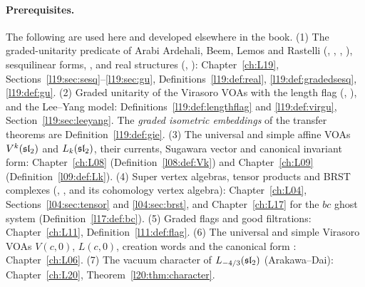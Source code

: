 \paragraph{Prerequisites.} The following are used here and developed elsewhere in the book.
(1) The graded-unitarity predicate of Arabi Ardehali, Beem, Lemos and Rastelli (,
, , ), sesquilinear forms, ,
 and real structures (, ): Chapter~\ref{ch:L19},
Sections~\ref{l19:sec:sesq}--\ref{l19:sec:gu}, Definitions~\ref{l19:def:real}, \ref{l19:def:gradedsesq},
\ref{l19:def:gu}. (2) Graded unitarity of the Virasoro VOAs with the length flag (,
), and the Lee--Yang model: Definitions~\ref{l19:def:lengthflag} and \ref{l19:def:virgu},
Section~\ref{l19:sec:leeyang}. The \emph{graded isometric embeddings} of the transfer theorems are
Definition~\ref{l19:def:gie}. (3) The universal and simple affine VOAs $V^k(\mathfrak{sl}_2)$ and
$L_k(\mathfrak{sl}_2)$, their currents, Sugawara vector and canonical invariant form: Chapter~\ref{ch:L08}
(Definition~\ref{l08:def:Vk}) and Chapter~\ref{ch:L09} (Definition~\ref{l09:def:Lk}). (4) Super vertex algebras,
tensor products and BRST complexes (, ,  and
its cohomology vertex algebra): Chapter~\ref{ch:L04}, Sections~\ref{l04:sec:tensor} and \ref{l04:sec:brst}, and
Chapter~\ref{ch:L17} for the $bc$ ghost system (Definition~\ref{l17:def:bc}). (5) Graded flags and good filtrations:
Chapter~\ref{ch:L11}, Definition~\ref{l11:def:flag}. (6) The universal and simple Virasoro VOAs $V(c,0)$, $L(c,0)$,
creation words and the canonical form : Chapter~\ref{ch:L06}. (7) The vacuum character of
$L_{-4/3}(\mathfrak{sl}_2)$ (Arakawa--Dai): Chapter~\ref{ch:L20}, Theorem~\ref{l20:thm:character}.

